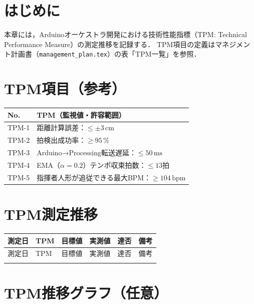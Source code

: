 
\section{はじめに}
本章には，Arduinoオーケストラ開発における技術性能指標（TPM: Technical Performance Measure）の測定推移を記録する．
TPM項目の定義はマネジメント計画書（\texttt{management\_plan.tex}）の表「TPM一覧」を参照．

\section{TPM項目（参考）}

\begin{table}[H]
  \centering
  \begin{tabularx}{\linewidth}{lX}
    \toprule
    No. & TPM（監視値・許容範囲） \\
    \midrule
    TPM-1 & 距離計算誤差：$\leq \pm 3\,\mathrm{cm}$ \\
    TPM-2 & 拍検出成功率：$\geq 95\,\%$ \\
    TPM-3 & Arduino→Processing転送遅延：$\leq 50\,\mathrm{ms}$ \\
    TPM-4 & EMA（$\alpha=0.2$）テンポ収束拍数：$\leq 13$拍 \\
    TPM-5 & 指揮者人形が追従できる最大BPM：$\geq 104\,\mathrm{bpm}$ \\
    \bottomrule
  \end{tabularx}
\end{table}

\section{TPM測定推移}

\begin{longtable}{p{2cm}p{1.5cm}p{2.5cm}p{2.5cm}p{1.5cm}p{4cm}}
\toprule
測定日 & TPM & 目標値 & 実測値 & 達否 & 備考 \\
\midrule
\endfirsthead

\toprule
測定日 & TPM & 目標値 & 実測値 & 達否 & 備考 \\
\midrule
\endhead


\bottomrule
\endfoot
\end{longtable}

\section{TPM推移グラフ（任意）}

%

